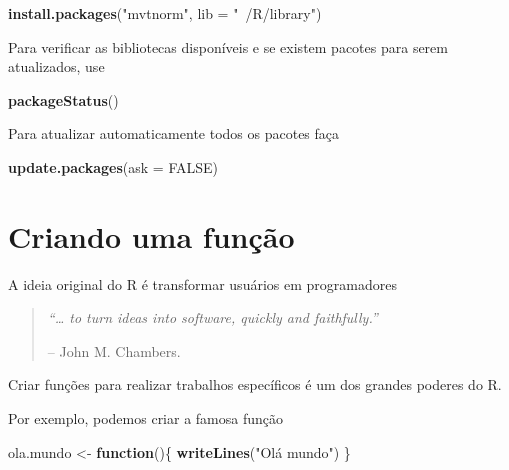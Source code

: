\documentclass[10pt,a4paper]{book}
\newenvironment{Shaded}{\begin{snugshade}}{\end{snugshade}}
\newcommand{\KeywordTok}[1]{\textcolor[rgb]{0.13,0.29,0.53}{\textbf{#1}}}
\newcommand{\DataTypeTok}[1]{\textcolor[rgb]{0.13,0.29,0.53}{#1}}
\newcommand{\StringTok}[1]{\textcolor[rgb]{0.31,0.60,0.02}{#1}}
\newcommand{\OtherTok}[1]{\textcolor[rgb]{0.56,0.35,0.01}{#1}}
\newcommand{\ControlFlowTok}[1]{\textcolor[rgb]{0.13,0.29,0.53}{\textbf{#1}}}
\newcommand{\NormalTok}[1]{#1}
\begin{document}
\begin{Shaded}
\begin{Highlighting}[]
\KeywordTok{install.packages}\NormalTok{(}\StringTok{"mvtnorm"}\NormalTok{, }\DataTypeTok{lib =} \StringTok{"~/R/library"}\NormalTok{)}
\end{Highlighting}
\end{Shaded}

Para verificar as bibliotecas disponíveis e se existem pacotes para
serem atualizados, use

\begin{Shaded}
\begin{Highlighting}[]
\KeywordTok{packageStatus}\NormalTok{()}
\end{Highlighting}
\end{Shaded}

Para atualizar automaticamente todos os pacotes faça

\begin{Shaded}
\begin{Highlighting}[]
\KeywordTok{update.packages}\NormalTok{(}\DataTypeTok{ask =} \OtherTok{FALSE}\NormalTok{)}
\end{Highlighting}
\end{Shaded}

\section{Criando uma função}\label{criando-uma-funuxe7uxe3o}

A ideia original do R é transformar usuários em programadores

\begin{quote}
\emph{``\ldots{} to turn ideas into software, quickly and faithfully.''}

-- John M. Chambers.
\end{quote}

Criar funções para realizar trabalhos específicos é um dos grandes
poderes do R.

Por exemplo, podemos criar a famosa função

\begin{Shaded}
\begin{Highlighting}[]
\NormalTok{ola.mundo <-}\StringTok{ }\ControlFlowTok{function}\NormalTok{()\{}
    \KeywordTok{writeLines}\NormalTok{(}\StringTok{"Olá mundo"}\NormalTok{)}
\NormalTok{\}}
\end{Highlighting}
\end{Shaded}
\end{document}
